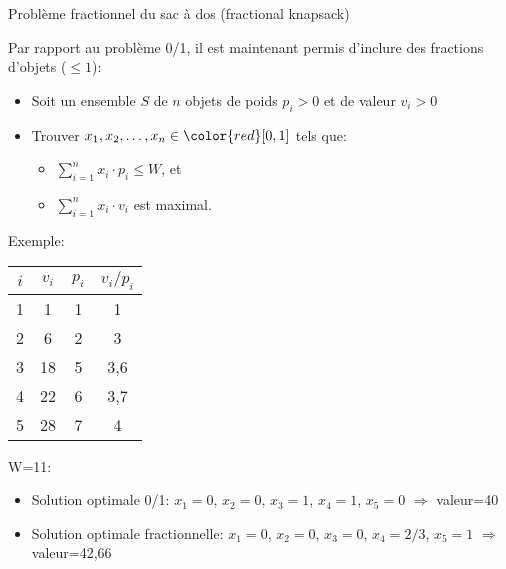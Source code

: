 \begin{frame}{Problème fractionnel du sac à dos (fractional knapsack)}

Par rapport au problème 0/1, il est maintenant permis d'inclure
des fractions d'objets ($\leq 1$):
\begin{itemize}
\item Soit un ensemble $S$ de $n$ objets de poids $p_i>0$ et de valeur $v_i>0$
\item Trouver $x_1, x_2, \ldots, x_n \in {\color{red}[0,1]}$ tels que:
\begin{itemize}
\item $\sum_{i=1}^n x_i\cdot p_i\leq W$, et
\item $\sum_{i=1}^n x_i\cdot v_i$ est maximal.
\end{itemize}
\end{itemize}
\bigskip
{\small
Exemple:
\vspace{-0.5cm}
\begin{center}\small
\begin{tabular}{cccc}
$i$ & $v_i$ & $p_i$ & $v_i/p_i$\\
\hline
1 & 1 & 1 & 1\\
2 & 6 & 2 & 3\\
3 & 18 & 5 & 3,6\\
4 & 22 & 6 & 3,7\\
5 & 28 & 7 & 4\\
\end{tabular}
\end{center}
W=11:
\begin{itemize}
\item Solution optimale 0/1: $x_1=0$, $x_2=0$, $x_3=1$, $x_4=1$, $x_5=0$ $\Rightarrow$ valeur=40
\item Solution optimale fractionnelle: $x_1=0$, $x_2=0$, $x_3=0$, $x_4=2/3$, $x_5=1$ $\Rightarrow$ valeur=42,66
\end{itemize}
}
\end{frame}


